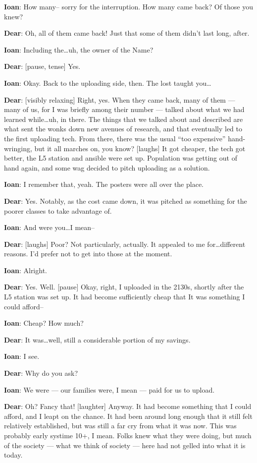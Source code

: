 \textbf{Ioan}: How many-- sorry for the interruption. How many came back? Of those you knew?

\textbf{Dear}: Oh, all of them came back! Just that some of them didn't last long, after.

\textbf{Ioan}: Including the\ldots{}uh, the owner of the Name?

\textbf{Dear}: {[}pause, tense{]} Yes.

\textbf{Ioan}: Okay. Back to the uploading side, then. The lost taught you\ldots{}

\textbf{Dear}: {[}visibly relaxing{]} Right, yes. When they came back, many of them — many of us, for I was briefly among their number — talked about what we had learned while\ldots{}uh, in there. The things that we talked about and described are what sent the wonks down new avenues of research, and that eventually led to the first uploading tech. From there, there was the usual ``too expensive'' hand-wringing, but it all marches on, you know? {[}laughs{]} It got cheaper, the tech got better, the L5 station and ansible were set up. Population was getting out of hand again, and some wag decided to pitch uploading as a solution.

\textbf{Ioan}: I remember that, yeah. The posters were all over the place.

\textbf{Dear}: Yes. Notably, as the cost came down, it was pitched as something for the poorer classes to take advantage of.

\textbf{Ioan}: And were you\ldots{}I mean--

\textbf{Dear}: {[}laughs{]} Poor? Not particularly, actually. It appealed to me for\ldots{}different reasons. I'd prefer not to get into those at the moment.

\textbf{Ioan}: Alright.

\textbf{Dear}: Yes. Well. {[}pause{]} Okay, right, I uploaded in the 2130s, shortly after the L5 station was set up. It had become sufficiently cheap that It was something I could afford--

\textbf{Ioan}: Cheap? How much?

\textbf{Dear}: It was\ldots{}well, still a considerable portion of my savings.

\textbf{Ioan}: I see.

\textbf{Dear}: Why do you ask?

\textbf{Ioan}: We were — our families were, I mean — paid for us to upload.

\textbf{Dear}: Oh? Fancy that! {[}laughter{]} Anyway. It had become something that I could afford, and I leapt on the chance. It had been around long enough that it still felt relatively established, but was still a far cry from what it was now. This was probably early systime 10+, I mean. Folks knew what they were doing, but much of the society — what we think of society — here had not gelled into what it is today.

